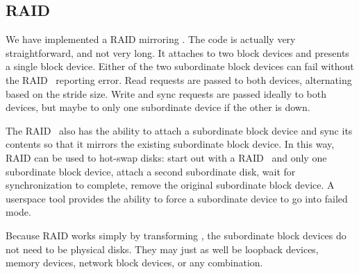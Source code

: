 \subsection{RAID}
\label{sec:modules:raid}

We have implemented a RAID mirroring \module. The code is actually very
straightforward, and not very long. It attaches to two block devices and
presents a single block device. Either of the two subordinate block devices can
fail without the RAID \module\ reporting error. Read requests are passed to both
devices, alternating based on the stride size. Write and sync requests are
passed ideally to both devices, but maybe to only one subordinate device if the
other is down.

The RAID \module\ also has the ability to attach a subordinate block device and
sync its contents so that it mirrors the existing subordinate block device. In
this way, RAID can be used to hot-swap disks: start out with a RAID \module\ and
only one subordinate block device, attach a second subordinate disk, wait for
synchronization to complete, remove the original subordinate block device. A
userspace tool provides the ability to force a subordinate device to go into
failed mode.

Because RAID works simply by transforming \chdescs, the subordinate
block devices do not need to be physical disks. They may just as well
be loopback devices, memory devices, network block devices, or any
combination.
